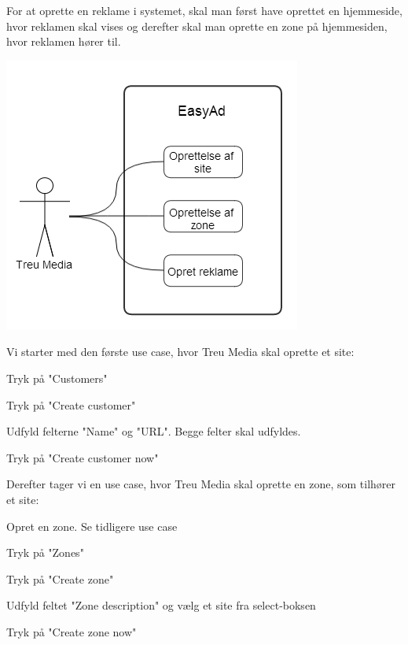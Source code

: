 \documentclass[a4paper,12pt]{article}
\begin{document}
For at oprette en reklame i systemet, skal man først have oprettet en hjemmeside, hvor reklamen skal vises og derefter skal man oprette en zone på hjemmesiden, hvor reklamen hører til.

\centerline{\includegraphics[scale=0.5]{treusecases}}

Vi starter med den første use case, hvor Treu Media skal oprette et site:

\begin{usecase}
 {
	\item Tryk på "Customers"
	\item Tryk på "Create customer"
	\item Udfyld felterne "Name" og "URL". Begge felter skal udfyldes.
	\item Tryk på "Create customer now"
}
\end{usecase}

Derefter tager vi en use case, hvor Treu Media skal oprette en zone, som tilhører et site:
\begin{usecase}
 {
	\item Opret en zone. Se tidligere use case
	\item Tryk på "Zones"
	\item Tryk på "Create zone"
	\item Udfyld feltet "Zone description" og vælg et site fra select-boksen
	\item Tryk på "Create zone now"
}
\end{usecase}
\end{document}
